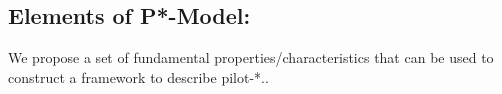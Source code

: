 \documentclass[conference,final]{IEEEtran}
\newcommand{\jhanote}[1]{ {\textcolor{red} { ***shantenu: #1 }}}
\newcommand{\jhanote}[1]{}
\begin{document}
% 
% 


\subsection{Elements of P*-Model:}

We propose a set of fundamental properties/characteristics that can be
used to construct a framework to describe pilot-*..

\end{document}

